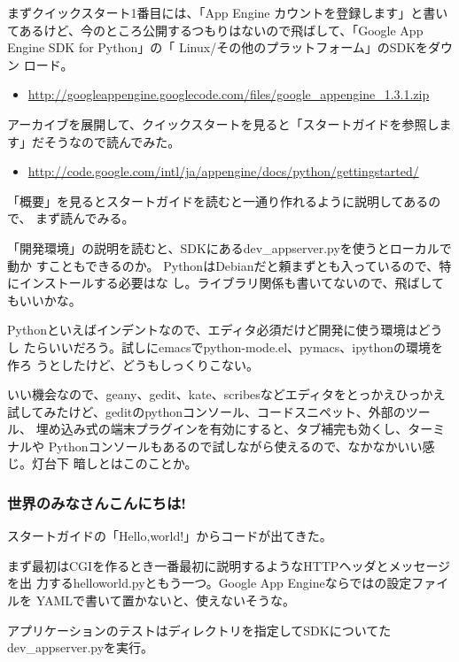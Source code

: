 \documentclass[mingoth,a4paper]{jsarticle}
\begin{document}
まずクイックスタート1番目には、「App Engine カウントを登録します」と書い
てあるけど、今のところ公開するつもりはないので飛ばして、「Google App
Engine SDK for Python」の「 Linux/その他のプラットフォーム」のSDKをダウン
ロード。

\begin{itemize}
 \item \url{http://googleappengine.googlecode.com/files/google_appengine_1.3.1.zip}
\end{itemize}

アーカイブを展開して、クイックスタートを見ると「スタートガイドを参照しま
す」だそうなので読んでみた。
\begin{itemize}
 \item \url{http://code.google.com/intl/ja/appengine/docs/python/gettingstarted/}
\end{itemize}

「概要」を見るとスタートガイドを読むと一通り作れるように説明してあるので、
まず読んでみる。

「開発環境」の説明を読むと、SDKにあるdev\_appserver.pyを使うとローカルで動か
すこともできるのか。
PythonはDebianだと頼まずとも入っているので、特にインストールする必要はな
し。ライブラリ関係も書いてないので、飛ばしてもいいかな。

Pythonといえばインデントなので、エディタ必須だけど開発に使う環境はどうし
たらいいだろう。試しにemacsでpython-mode.el、pymacs、ipythonの環境を作ろ
うとしたけど、どうもしっくりこない。

いい機会なので、geany、gedit、kate、scribesなどエディタをとっかえひっかえ
試してみたけど、geditのpythonコンソール、コードスニペット、外部のツール、
埋め込み式の端末プラグインを有効にすると、タブ補完も効くし、ターミナルや
Pythonコンソールもあるので試しながら使えるので、なかなかいい感じ。灯台下
暗しとはこのことか。

\subsubsection{世界のみなさんこんにちは!}
スタートガイドの「Hello,world!」からコードが出てきた。

まず最初はCGIを作るとき一番最初に説明するようなHTTPヘッダとメッセージを出
力するhelloworld.pyともう一つ。Google App Engineならではの設定ファイルを
YAMLで書いて置かないと、使えないそうな。

アプリケーションのテストはディレクトリを指定してSDKについてた
dev\_appserver.pyを実行。

\end{document}
